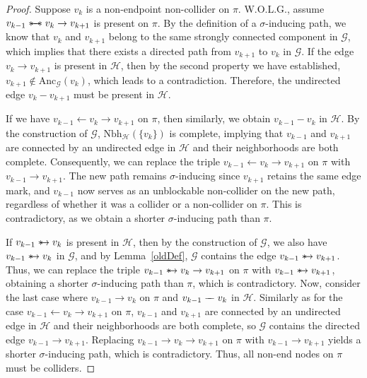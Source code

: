 \documentclass[accepted]{uai2025} %
\newcommand{\anc}{\text{Anc}}
\newcommand{\tuh}{\mathrel{\rightarrow}}
\newcommand{\hut}{\mathrel{\leftarrow}}
\newcommand{\suh}{\mathrel{{\ast\mkern-11mu\to}}}
\newcommand{\sus}{\mathrel{{\ast\mkern-11mu\relbar\mkern-9mu\relbar\mkern-11mu\ast}}}
\newcommand{\tut}{\mathrel{{\relbar\mkern-9mu\relbar}}}
\begin{document}
\begin{proof}
Suppose \( v_k \) is a non-endpoint non-collider on \( \pi \). W.O.L.G., assume \( v_{k-1} \sus v_k \rightarrow v_{k+1} \) is present on \( \pi \). By the definition of a \( \sigma \)-inducing path, we know that \( v_k \) and \( v_{k+1} \) belong to the same strongly connected component in \( \mathcal{G} \), which implies that there exists a directed path from \( v_{k+1} \) to \( v_k \) in \( \mathcal{G} \). If the edge \( v_k \rightarrow v_{k+1} \) is present in \( \mathcal{H} \), then by the second property we have established, $v_{k+1}\notin \anc_\mathcal{G}(v_k)$, which leads to a contradiction. Therefore, the undirected edge \( v_k - v_{k+1} \) must be present in \( \mathcal{H} \). 

If we have \( v_{k-1} \leftarrow v_k \rightarrow v_{k+1} \) on \( \pi \), then similarly, we obtain \( v_{k-1} - v_k \) in \( \mathcal{H} \). By the construction of \( \mathcal{G} \), \( \text{Nbh}_\mathcal{H}(\{v_k\}) \) is complete, implying that \( v_{k-1} \) and \( v_{k+1} \) are connected by an undirected edge in \( \mathcal{H} \) and their neighborhoods are both complete. Consequently, we can replace the triple \( v_{k-1} \leftarrow v_k \rightarrow v_{k+1} \) on \( \pi \) with \( v_{k-1} \rightarrow v_{k+1} \). The new path remains \( \sigma \)-inducing since \( v_{k+1} \) retains the same edge mark, and \( v_{k-1} \) now serves as an unblockable non-collider on the new path, regardless of whether it was a collider or a non-collider on \( \pi \). This is contradictory, as we obtain a shorter \( \sigma \)-inducing path than \( \pi \).

If \( v_{k-1} \suh v_k \) is present in \( \mathcal{H} \), then by the construction of \( \mathcal{G} \), we also have \( v_{k-1} \suh v_k \) in \( \mathcal{G} \), and by Lemma~\ref{oldDef}, \( \mathcal{G} \) contains the edge \( v_{k-1} \suh v_{k+1} \). Thus, we can replace the triple \( v_{k-1} \suh v_k \tuh v_{k+1} \) on \( \pi \) with \( v_{k-1} \suh v_{k+1} \), obtaining a shorter \( \sigma \)-inducing path than \( \pi \), which is contradictory. Now, consider the last case where \( v_{k-1} \rightarrow v_k \) on \( \pi \) and \( v_{k-1} \tut v_k \) in \( \mathcal{H} \). Similarly as for the case $v_{k-1}\hut v_k\tuh v_{k+1}$ on $\pi$, \( v_{k-1} \) and \( v_{k+1} \) are connected by an undirected edge in \( \mathcal{H} \) and their neighborhoods are both complete, so $\mathcal{G}$ contains the directed edge $v_{k-1}\tuh v_{k+1}$. Replacing \( v_{k-1} \rightarrow v_k \rightarrow v_{k+1} \) on \( \pi \) with \( v_{k-1} \rightarrow v_{k+1} \) yields a shorter \( \sigma \)-inducing path, which is contradictory. Thus, all non-end nodes on \( \pi \) must be colliders.


\end{proof}
\end{document}
